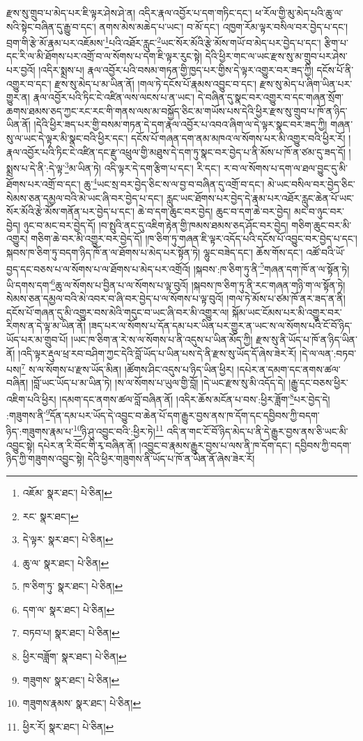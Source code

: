 རྫས་སུ་གྲུབ་པ་མེད་པར་ཇི་ལྟར་ཤེས་ཤེ་ན། འདིར་རྣལ་འབྱོར་པ་དག་གཏིང་དང་། ཕ་རོལ་གྱི་མུ་མེད་པའི་ཆུ་ལ་སའི་སྟེང་བཞིན་དུ་རྒྱུ་བ་དང་། ནགས་མེས་མཆེད་པ་ཡང་། བ་མོ་དང་། འཁྱག་རོམ་ལྟར་བསིལ་བར་བྱེད་པ་དང་། བྲག་གི་རྩེ་མོ་རྣམ་པར་འཇོམས་\footnote{འཇོམ་  སྣར་ཐང་།  པེ་ཅིན། }པའི་འཐོར་རླུང་\footnote{རང་  སྣར་ཐང་། }ཡང་སོར་མོའི་རྩེ་མོས་གཡོ་བ་མེད་པར་བྱེད་པ་དང་། རྩིག་པ་དང་རི་ལ་མི་ཐོགས་པར་འགྲོ་བ་ལ་སོགས་པ་དག་ཇི་ལྟར་རུང་སྟེ། དེའི་ཕྱིར་གང་ལ་ཡང་རྫས་སུ་མ་གྲུབ་པར་ཤེས་པར་བྱའོ། །འདིར་སྨྲས་པ། རྣལ་འབྱོར་པའི་བསམ་གཏན་གྱི་ཁྱད་པར་གྱིས་དེ་ལྟར་འགྱུར་བར་ཟད་ཀྱི། དངོས་པོ་ནི་འགྱུར་བ་དང་། རྫས་སུ་མེད་པ་མ་ཡིན་ནོ། །གལ་ཏེ་དངོས་པོ་རྣམས་འབྱུང་བ་དང་། རྫས་སུ་མེད་པ་ཞིག་ཡིན་པར་གྱུར་ན། རྣལ་འབྱོར་པའི་ཏིང་ངེ་འཛིན་ལས་ལངས་པ་ན་ཡང་། དེ་བཞིན་དུ་སྣང་བར་འགྱུར་བ་དང་གཞན་སྲོག་ཆགས་ཐམས་ཅད་ཀྱང་རང་རང་གི་གནས་ལས་མ་བསྐྱོད་ཅིང་མ་གཡོས་པས་དེའི་ཕྱིར་རྫས་སུ་གྲུབ་པ་ཁོ་ན་ཉིད་ཡིན་ནོ། །དེའི་ཕྱིར་ཟད་པར་གྱི་བསམ་གཏན་དེ་དག་རྣལ་འབྱོར་པ་འབའ་ཞིག་ལ་དེ་ལྟར་སྣང་བར་ཟད་ཀྱི། གཞན་སུ་ལ་ཡང་དེ་ལྟར་མི་སྣང་བའི་ཕྱིར་དང་། དངོས་པོ་གཞན་དག་ནམ་མཁའ་ལ་སོགས་པར་མི་འགྱུར་བའི་ཕྱིར་རོ། །རྣལ་འབྱོར་པའི་ཏིང་ངེ་འཛིན་དང་རྫུ་འཕྲུལ་གྱི་མཐུས་དེ་དག་ཏུ་སྣང་བར་བྱེད་པ་ནི་མོས་པ་ཁོ་ན་ཙམ་དུ་ཟད་དོ། །སྨྲས་པ་དེ་ནི་:དེ་ལྟ་\footnote{དེ་ལྟར་  སྣར་ཐང་།  པེ་ཅིན། }མ་ཡིན་ཏེ། འདི་ལྟར་དེ་དག་རྩིག་པ་དང་། རི་དང་། ར་བ་ལ་སོགས་པ་དག་ལ་ཐལ་བྱུང་དུ་མི་ཐོགས་པར་འགྲོ་བ་དང་། ཆུ་\footnote{ཆུ་ལ་  སྣར་ཐང་།  པེ་ཅིན། }ཡང་སྲ་བར་བྱེད་ཅིང་ས་ལ་བྱ་བ་བཞིན་དུ་འགྲོ་བ་དང་། མེ་ཡང་བསིལ་བར་བྱེད་ཅིང་སེམས་ཅན་དམྱལ་བའི་མེ་ཡང་ཞི་བར་བྱེད་པ་དང་། རླུང་ཡང་ཐོགས་པར་བྱེད་དེ་རྣམ་པར་འཐོར་རླུང་ཆེན་པོ་ཡང་སོར་མོའི་རྩེ་མོས་གནོན་པར་བྱེད་པ་དང་། ཆེ་བ་དག་ཆུང་བར་བྱེད། ཆུང་བ་དག་ཆེ་བར་བྱེད། མང་བ་ཉུང་བར་བྱེད། ཉུང་བ་མང་བར་བྱེད་དོ། །བ་སྤུའི་ནང་དུ་འཇིག་རྟེན་གྱི་ཁམས་ཐམས་ཅད་ཤོང་བར་བྱེད། གཅིག་ཆུང་བར་མི་འགྱུར། གཅིག་ཆེ་བར་མི་འགྱུར་བར་བྱེད་དོ། །ཁ་ཅིག་ཏུ་གཞན་ཇི་ལྟར་འདོད་པའི་དངོས་པོ་འབྱུང་བར་བྱེད་པ་དང་། སྐབས་ཁ་ཅིག་ཏུ་བདག་ཉིད་ཁོ་ན་ལ་ཐོགས་པ་མེད་པར་སྟོན་ཏེ། ལྷུང་བཟེད་དང་། ཆོས་གོས་དང་། འཚོ་བའི་ཡོ་བྱད་དང་བཅས་པ་ལ་སོགས་པ་ལ་ཐོགས་པ་མེད་པར་འགྲོའོ། །སྐབས་:ཁ་ཅིག་ཏུ་ནི་\footnote{ཁ་ཅིག་ཏུ་  སྣར་ཐང་།  པེ་ཅིན། }གཞན་དག་ཁོ་ན་ལ་སྟོན་ཏེ། ཡི་དགས་དག་\footnote{དག་ལ་  སྣར་ཐང་།  པེ་ཅིན། }ཆུ་ལ་སོགས་པ་བྱིན་པ་ལ་སོགས་པ་ལྟ་བུའོ། །སྐབས་ཁ་ཅིག་ཏུ་ནི་རང་གཞན་གཉི་ག་ལ་སྟོན་ཏེ། སེམས་ཅན་དམྱལ་བའི་མེ་འབར་བ་ཞི་བར་བྱེད་པ་ལ་སོགས་པ་ལྟ་བུའོ། །གལ་ཏེ་མོས་པ་ཙམ་ཁོ་ནར་ཟད་ན་ནི། དངོས་པོ་གཞན་དུ་མི་འགྱུར་བས་མེའི་གདུང་བ་ཡང་ཞི་བར་མི་འགྱུར་ལ། སྐོམ་ཡང་ངོམས་པར་མི་འགྱུར་བར་རིགས་ན་དེ་ལྟ་མ་ཡིན་ནོ། །ཟད་པར་ལ་སོགས་པ་དོན་དམ་པར་ཡིན་པར་གྱུར་ན་ཡང་ས་ལ་སོགས་པའི་ངོ་བོ་ཉིད་ཡོད་པར་མ་གྲུབ་པོ། །ཡང་ཁ་ཅིག་ན་རེ་ས་ལ་སོགས་པ་ནི་འདུས་པ་ཡིན་མོད་ཀྱི། རྫས་སུ་ནི་ཡོད་པ་ཁོ་ན་ཉིད་ཡིན་ནོ། །འདི་ལྟར་རྡུལ་ཕྲ་རབ་བཤིག་ཀྱང་དེའི་བློ་ཡོད་པ་ཡིན་པས་དེ་ནི་རྫས་སུ་ཡོད་དོ་ཞེས་ཟེར་རོ། །དེ་ལ་ལན་:བཏབ་པས།\footnote{བཏབ་པ།  སྣར་ཐང་།  པེ་ཅིན། } ས་ལ་སོགས་པ་རྫས་ཡོད་མིན། །ཚོགས་ཤིང་འདུས་པ་ཉིད་ཡིན་ཕྱིར། །དཔེར་ན་དམག་དང་ནགས་ཚལ་བཞིན། །བློ་ཡང་ཡོད་པ་མ་ཡིན་ཏེ། །ས་ལ་སོགས་པ་ཡུལ་གྱི་བློ། །དེ་ཡང་རྫས་སུ་མི་འདོད་དེ། །རྒྱུ་དང་བཅས་ཕྱིར་འཇིག་པའི་ཕྱིར། །དམག་དང་ནགས་ཚལ་བློ་བཞིན་ནོ། །འདིར་ཆོས་མངོན་པ་བས་:ཕྱིར་ཟློག་\footnote{ཕྱིར་བཟློག་  སྣར་ཐང་།  པེ་ཅིན། }པར་བྱེད་དེ། :གཟུགས་ནི་\footnote{གཟུགས་  སྣར་ཐང་།  པེ་ཅིན། }དོན་དམ་པར་ཡོད་དེ་འབྱུང་བ་ཆེན་པོ་དག་རྒྱུར་བྱས་ནས་ཁ་དོག་དང་དབྱིབས་ཀྱི་བདག་ཉིད་:གཟུགས་རྣམ་པ་\footnote{གཟུགས་རྣམས་  སྣར་ཐང་།  པེ་ཅིན། }ཉི་ཤུ་འབྱུང་བའི་:ཕྱིར་ཏེ།\footnote{ཕྱིར་རོ།  སྣར་ཐང་།  པེ་ཅིན། } འདི་ན་གང་ངོ་བོ་ཉིད་མེད་པ་ནི་དེ་རྒྱུར་བྱས་ནས་ཅི་ཡང་མི་འབྱུང་སྟེ། དཔེར་ན་རི་བོང་གི་རྭ་བཞིན་ནོ། །འབྱུང་བ་རྣམས་རྒྱུར་བྱས་པ་ལས་ནི་ཁ་དོག་དང་། དབྱིབས་ཀྱི་བདག་ཉིད་ཀྱི་གཟུགས་འབྱུང་སྟེ། དེའི་ཕྱིར་གཟུགས་ནི་ཡོད་པ་ཁོ་ན་ཡིན་ནོ་ཞེས་ཟེར་རོ། 